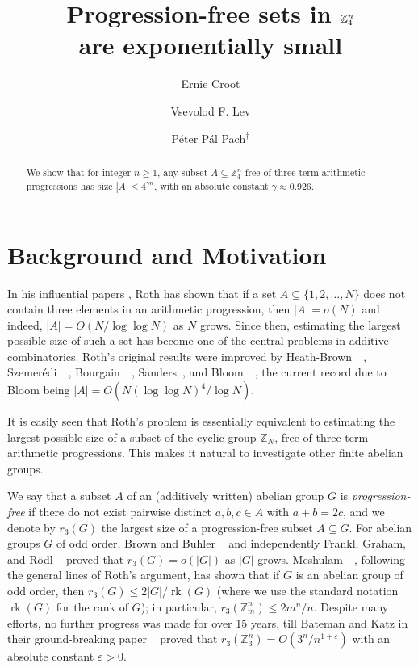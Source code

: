 \documentclass[12pt,reqno]{amsart}
\title[Progression-free sets in $\Z_4^n$]%
  {Progression-free sets in $\Z_4^n$ \\ are exponentially small}
\author{Ernie Croot}
\author{Vsevolod F. Lev}
\author[P\'eter P\'al Pach]{P\'eter P\'al Pach$^\dag$}
\newcommand{\eps}{\varepsilon}
\newcommand{\gam}{\gamma}
\newcommand{\Z}{{\mathbb Z}}
\newcommand{\<}{\langle}
\renewcommand{\>}{\rangle}
\newcommand{\seq}{\subseteq}
\newcommand{\longc}{,\ldots,}
\DeclareMathOperator{\rk}{rk}
\newcommand{\refb}[1]{~\cite{b:#1}}
\theoremstyle{remark}
\begin{document}
\baselineskip=16pt

\begin{abstract}
We show that for integer $n\ge 1$, any subset $A\seq \Z_4^n$ free of
three-term arithmetic progressions has size $|A|\le 4^{\gam n}$, with an
absolute constant $\gam\approx 0.926$.
\end{abstract}

\maketitle

\section{Background and Motivation}\label{s:intro}

In his influential papers \cite{b:r1,b:r2}, Roth has shown that if a set
$A\seq\{1,2\longc N\}$ does not contain three elements in an arithmetic
progression, then $|A|=o(N)$ and indeed, $|A|=O(N/\log\log N)$ as $N$ grows.
Since then, estimating the largest possible size of such a set has become one
of the central problems in additive combinatorics. Roth's original results
were improved by Heath-Brown~\refb{h}, Szemer\'edi~\refb{sz},
Bourgain~\refb{b}, Sanders~\cite{b:s2,b:s3}, and Bloom~\refb{bl}, the current
record due to Bloom being $|A|=O(N(\log\log N)^4/\log N)$.

It is easily seen that Roth's problem is essentially equivalent to estimating
the largest possible size of a subset of the cyclic group $\Z_N$, free of
three-term arithmetic progressions. This makes it natural to investigate
other finite abelian groups.

We say that a subset $A$ of an (additively written) abelian group $G$ is
\emph{progression-free} if there do not exist pairwise distinct $a,b,c\in A$
with $a+b=2c$, and we denote by $r_3(G)$ the largest size of a
progression-free subset $A\seq G$. For abelian groups $G$ of odd order, Brown
and Buhler \refb{bb} and independently Frankl, Graham, and R\"odl \refb{fgr}
proved that $r_3(G)=o(|G|)$ as $|G|$ grows. Meshulam~\refb{m}, following the
general lines of Roth's argument, has shown that if $G$ is an abelian group
of odd order, then $r_3(G)\le 2|G|/\rk(G)$ (where we use the standard
notation $\rk(G)$ for the rank of $G$); in particular, $r_3(\Z_m^n)\le
2m^n/n$. Despite many efforts, no further progress was made for over 15
years, till Bateman and Katz in their ground-breaking paper \refb{bk} proved
that $r_3(\Z_3^n)=O(3^n/n^{1+\eps})$ with an absolute constant $\eps>0$.
\end{document}
